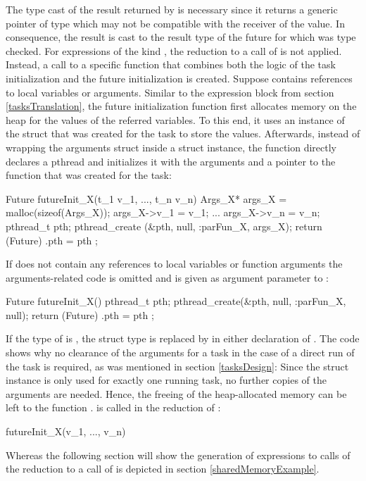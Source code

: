 The type cast of the result returned by  is necessary since it returns a generic pointer of type  which may not be compatible with the receiver of the value. In consequence, the result is cast to the result type of the future for which  was type checked. 
For expressions of the kind , the reduction to a call of  is not applied. Instead, a call to a specific function  that combines both the logic of the task initialization and the future initialization is created. Suppose  contains references to local variables or arguments. Similar to the  expression block from section \ref{tasksTranslation}, the future initialization function first allocates memory on the heap for the values of the referred variables. To this end, it uses an instance of the  struct that was created for the task to store the values. Afterwards, instead of wrapping the arguments struct inside a  struct instance, the function directly declares a pthread and initializes it with the arguments and a pointer to the function  that was created for the task:
\begin{ccode}
Future futureInit_X(t_1 v_1, ..., t_n v_n) { 
  Args_X* args_X = malloc(sizeof(Args_X)); 
  args_X->v_1 = v_1; 
  ...
  args_X->v_n = v_n; 
  pthread_t pth; 
  pthread_create (&pth, null, :parFun_X, args_X); 
  return (Future){ .pth = pth }; 
}
\end{ccode}
If  does not contain any references to local variables or function arguments the arguments-related code is omitted and  is given as argument parameter to :
\begin{ccode}
Future futureInit_X() {
  pthread_t pth; 
  pthread_create(&pth, null, :parFun_X, null); 
  return (Future){ .pth = pth }; 
}
\end{ccode}
If the type of  is , the struct type  is replaced by  in either declaration of . The code shows why no clearance of the arguments for a task in the case of a direct run of the task is required, as was mentioned in section \ref{tasksDesign}: Since the struct instance  is only used for exactly one running task, no further copies of the arguments are needed. Hence, the freeing of the heap-allocated memory can be left to the function .  is called in the reduction of :
\begin{ccode}
futureInit_X(v_1, ..., v_n)
\end{ccode}
Whereas the following section will show the generation of expressions  to calls of  the reduction to a call of  is depicted in section \ref{sharedMemoryExample}.

